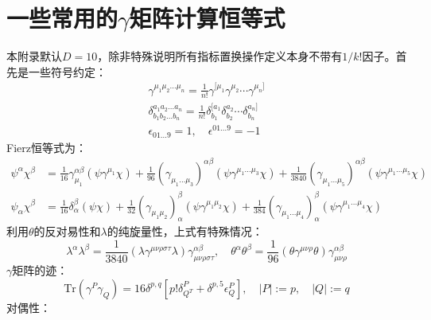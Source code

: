 \chapter{一些常用的$\gamma$矩阵计算恒等式}
\label{appendix:B}
本附录默认$D=10$，除非特殊说明所有指标置换操作定义本身不带有$1/k!$因子。首先是一些符号约定：
\begin{equation}
\begin{aligned}
		\gamma^{\mu_1\mu_2...\mu_n} = \frac{1}{n!} \gamma^{[\mu_1} \gamma^{\mu_2} \cdots \gamma^{\mu_n]}\\
	\delta_{b_1b_2...b_n}^{a_1a_2...a_n}=\frac{1}{n!}\delta_{b_1}^{[a_1}\delta_{b_2}^{a_2}\cdots\delta_{b_n}^{a_n]}\\
	\epsilon_{01...9}=1,\quad\epsilon^{01...9}=-1
\end{aligned}
\end{equation}
Fierz恒等式为：
\begin{align}
		\psi^\alpha \chi^\beta &= \frac{1}{16} \gamma_{\mu_1}^{\alpha\beta} (\psi \gamma^{\mu_1} \chi) + \frac{1}{96} (\gamma_{\mu_1...\mu_3})^{\alpha\beta} (\psi \gamma^{\mu_1...\mu_3} \chi) + \frac{1}{3840} (\gamma_{\mu_1...\mu_5})^{\alpha\beta} (\psi \gamma^{\mu_1...\mu_5} \chi) \\
		\psi_\alpha \chi^\beta &= \frac{1}{16} \delta_\alpha^\beta (\psi \chi) + \frac{1}{32} (\gamma_{\mu_1\mu_2})_\alpha^\beta (\psi \gamma^{\mu_1\mu_2} \chi) + \frac{1}{384} (\gamma_{\mu_1...\mu_4})_\alpha^\beta (\psi \gamma^{\mu_1...\mu_4} \chi)
\end{align}
利用$\theta$的反对易性和$\lambda$的纯旋量性，上式有特殊情况：
\begin{equation}
	\lambda^\alpha \lambda^\beta = \frac{1}{3840} (\lambda \gamma^{\mu\nu\rho\sigma\tau} \lambda) \gamma_{\mu\nu\rho\sigma\tau}^{\alpha\beta}, \quad \theta^\alpha \theta^\beta = \frac{1}{96} (\theta \gamma^{\mu\nu\rho} \theta) \gamma_{\mu\nu\rho}^{\alpha\beta}
\end{equation}
$\gamma$矩阵的迹：
\begin{equation}
	\mathrm{Tr}\left(\gamma^P\gamma_Q\right)=16\delta^{p,q}\left[p!\delta_{Q^T}^P+\delta^{p,5}\epsilon_Q^P\right],\quad|P|:=p,\quad|Q|:=q
\end{equation}
对偶性：
